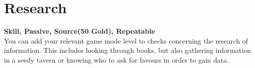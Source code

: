 \section{Research}\label{sec:research}
\textbf{Skill, Passive, Source(50 Gold), Repeatable}\\
You can add your relevant game mode level to checks concerning the research of information.
This includes looking through books, but also gathering information in a seedy tavern or knowing who to ask for favours in order to gain data.